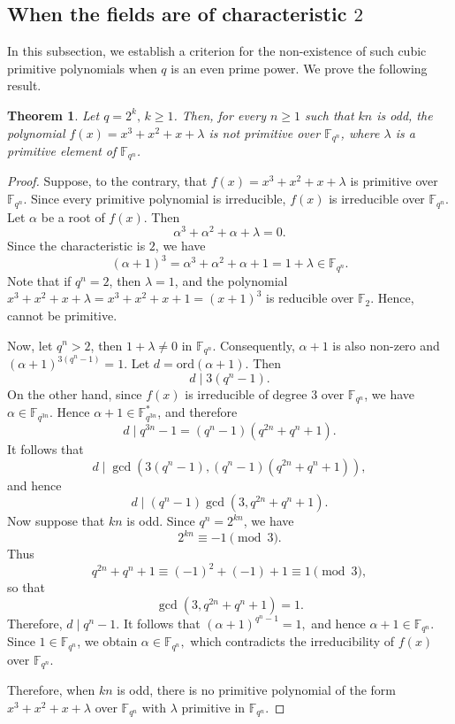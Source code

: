 \documentclass[preprint,12pt]{elsarticle}
\newtheorem{theorem}{Theorem}[section]
\begin{document}
\subsection{When the fields are of characteristic $2$}\label{S4}    

    In this subsection, we establish a criterion for the non-existence of such cubic primitive polynomials when $q$ is an even prime power. We prove the following result.

    \begin{theorem}\label{T3.2}
        Let $q=2^k,\, k\geq 1$. Then, for every $n\geq 1$ such that $kn$ is odd, the polynomial $f(x)=x^3+x^2+x+\lambda$ is not primitive over $\mathbb{F}_{q^n}$, where $\lambda$ is a primitive element of  $\mathbb{F}_{q^n}$.
    \end{theorem}
    \begin{proof}
        Suppose, to the contrary, that $f(x)=x^3+x^2+x+\lambda$ is primitive over $\mathbb{F}_{q^n}$. Since every primitive polynomial is irreducible, $f(x)$ is irreducible over $\mathbb{F}_{q^n}$. Let $\alpha$ be a root of $f(x)$. Then $$\alpha^3+\alpha^2+\alpha+\lambda=0.$$ Since the characteristic is $2$, we have $$(\alpha+1)^3=\alpha^3+\alpha^2+\alpha+1=1+\lambda\in\mathbb{F}_{q^n}.$$ 
        Note that if $q^n=2$, then $\lambda=1$, and the polynomial $x^3+x^2+x+\lambda=x^3+x^2+x+1=(x+1)^3$ is reducible over $\mathbb{F}_{2}$. Hence, cannot be primitive.
        
        Now, let $q^n>2$, then $1+\lambda\neq 0$ in $\mathbb{F}_{q^n}$. Consequently, $\alpha+1$ is also non-zero and   $(\alpha+1)^{3(q^n-1)}=1.$ Let $d=\mathrm{ord}(\alpha+1)$. Then $$d\mid 3(q^n-1).$$
        On the other hand, since $f(x)$ is irreducible of degree $3$ over $\mathbb{F}_{q^n}$, we have $\alpha\in\mathbb{F}_{q^{3n}}.$ Hence $\alpha+1\in\mathbb{F}_{q^{3n}}^*$, and therefore $$d\mid q^{3n}-1=(q^n-1)(q^{2n}+q^n+1).$$ It follows that $$d\mid \gcd\left(3(q^n-1),(q^n-1)(q^{2n}+q^n+1)\right),$$ and hence $$d\mid (q^n-1)\gcd\left(3,q^{2n}+q^n+1\right).$$
        Now suppose that $kn$ is odd. Since $q^n=2^{kn}$, we have $$2^{kn}\equiv -1\pmod 3.$$ Thus $$q^{2n}+q^n+1\equiv (-1)^2+(-1)+1\equiv 1\pmod 3,$$ so that $$\gcd\left(3,q^{2n}+q^n+1\right)=1.$$ Therefore, $d\mid q^n-1.$ It follows that $(\alpha+1)^{q^n-1}=1,$ and hence $\alpha+1\in\mathbb{F}_{q^n}.$ Since $1\in\mathbb{F}_{q^n}$, we obtain $\alpha\in\mathbb{F}_{q^n},$ which contradicts the irreducibility of $f(x)$ over $\mathbb{F}_{q^n}$.

        Therefore, when $kn$ is odd, there is no primitive polynomial of the form $x^3+x^2+x+\lambda$ over $\mathbb{F}_{q^n}$ with $\lambda$ primitive in $\mathbb{F}_{q^n}$.
    \end{proof}
\end{document}
